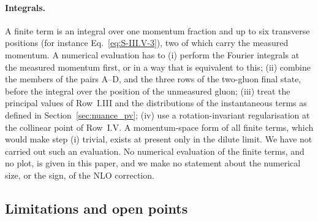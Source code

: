 \paragraph{Integrals.} A finite term is an integral over one momentum fraction and up to six transverse positions (for instance Eq.~\eqref{eq:S-III.V-3}), two of which carry the measured momentum. A numerical evaluation has to (i) perform the Fourier integrals at the measured momentum first, or in a way that is equivalent to this; (ii) combine the members of the pairs A--D, and the three rows of the two-gluon final state, before the integral over the position of the unmeasured gluon; (iii) treat the principal values of Row~I.III and the distributions of the instantaneous terms as defined in Section~\ref{sec:nuance_pv}; (iv) use a rotation-invariant regularisation at the collinear point of Row~I.V. A momentum-space form of all finite terms, which would make step (i) trivial, exists at present only in the dilute limit. We have not carried out such an evaluation. No numerical evaluation of the finite terms, and no plot, is given in this paper, and we make no statement about the numerical size, or the sign, of the NLO correction.

\subsection{Limitations and open points}\label{sec:openpoints}


